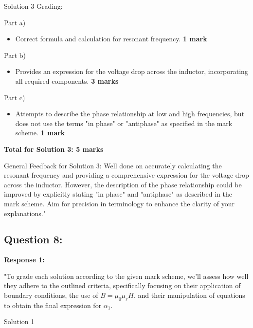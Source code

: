 \documentclass[a4paper,11pt]{article}
\begin{document}
Solution 3 Grading:

Part a)

\begin{itemize}
    \item Correct formula and calculation for resonant frequency. \textbf{1 mark}
\end{itemize}

Part b)

\begin{itemize}
    \item Provides an expression for the voltage drop across the inductor, incorporating all required components. \textbf{3 marks}
\end{itemize}

Part c)

\begin{itemize}
    \item Attempts to describe the phase relationship at low and high frequencies, but does not use the terms "in phase" or "antiphase" as specified in the mark scheme. \textbf{1 mark}
\end{itemize}

\textbf{Total for Solution 3: 5 marks}

General Feedback for Solution 3: Well done on accurately calculating the resonant frequency and providing a comprehensive expression for the voltage drop across the inductor. However, the description of the phase relationship could be improved by explicitly stating "in phase" and "antiphase" as described in the mark scheme. Aim for precision in terminology to enhance the clarity of your explanations."

\subsection*{Question 8:}

\textbf{Response 1:}

"To grade each solution according to the given mark scheme, we'll assess how well they adhere to the outlined criteria, specifically focusing on their application of boundary conditions, the use of \( B = \mu_0 \mu_r H \), and their manipulation of equations to obtain the final expression for \( \alpha_1 \).

Solution 1
\end{document}
